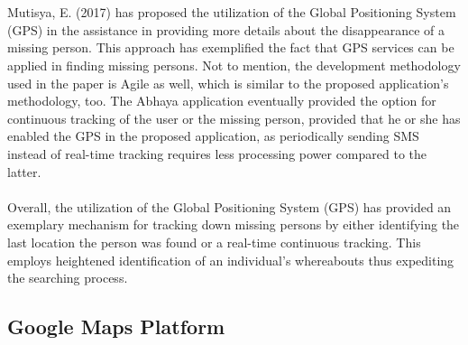 \\\\Mutisya, E. (2017) has proposed the utilization of the Global Positioning System (GPS) in the assistance in providing more details about the disappearance of a missing person. This approach has exemplified the fact that GPS services can be applied in finding missing persons. Not to mention, the development methodology used in the paper is Agile as well, which is similar to the proposed application’s methodology, too. The Abhaya application \cite{yarrabothu2015abhaya} eventually provided the option for continuous tracking of the user or the missing person, provided that he or she has enabled the GPS in the proposed application, as periodically sending SMS instead of real-time tracking requires less processing power compared to the latter.
\\\\Overall, the utilization of the Global Positioning System (GPS) has provided an exemplary mechanism for tracking down missing persons by either identifying the last location the person was found or a real-time continuous tracking. This employs heightened identification of an individual’s whereabouts thus expediting the searching process.

\subsection{Google Maps Platform}

